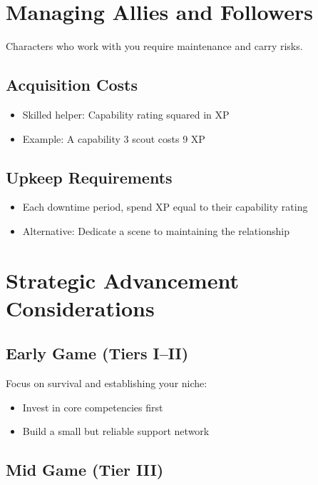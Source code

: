 \documentclass[11pt,twoside,openany]{book}
\begin{document}
\section*{Managing Allies and Followers} 

Characters who work with you require maintenance and carry risks.

\subsection*{Acquisition Costs}

\begin{itemize}
\item Skilled helper: Capability rating squared in XP
\item Example: A capability 3 scout costs 9 XP
\end{itemize}

\subsection*{Upkeep Requirements}

\begin{itemize}
\item Each downtime period, spend XP equal to their capability rating
\item Alternative: Dedicate a scene to maintaining the relationship
\end{itemize}

\section*{Strategic Advancement Considerations} 

\subsection*{Early Game (Tiers I–II)}

Focus on survival and establishing your niche:
\begin{itemize}
\item Invest in core competencies first
\item Build a small but reliable support network
\end{itemize}

\subsection*{Mid Game (Tier III)}
\end{document}
